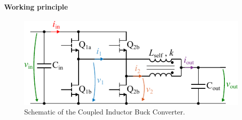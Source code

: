 \documentclass{IPEC2026}
\begin{document}
\paragraph{Working principle}
\begin{figure}
  \centering
  \includegraphics[width=0.9\columnwidth]{figures/Inkscape/Schematic.pdf}
  \caption{Schematic of the Coupled Inductor Buck Converter.}
  \label{fig:Schematic_BuckConfig_Coupled}
\end{figure}
\end{document}
